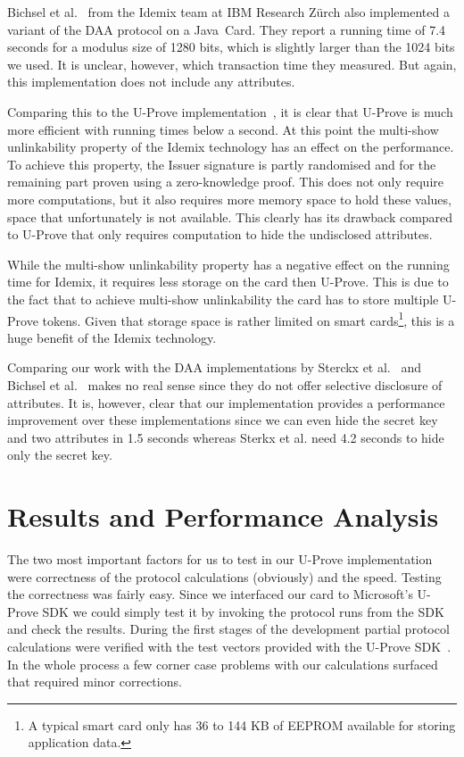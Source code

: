 Bichsel et al.~\cite{BichselCGS2009} from the Idemix team at IBM Research
Z\"urch also implemented a variant of the DAA protocol on a Java~Card. They
report a running time of 7.4 seconds for a modulus size of 1280 bits, which is
slightly larger than the 1024 bits we used. It is unclear, however, which
transaction time they measured. But again, this implementation does not include
any attributes.


Comparing this to the U-Prove implementation~\cite{MostowskiVullers11}, it is
clear that U-Prove is much more efficient with running times below a second.
At this point the multi-show unlinkability property of the Idemix technology has
an effect on the performance. To achieve this property, the Issuer signature is
partly randomised and for the remaining part proven using a zero-knowledge
proof. This does not only require more computations, but it also requires more
memory space to hold these values, space that unfortunately is not available.
This clearly has its drawback compared to U-Prove that only requires
computation to hide the undisclosed attributes.

While the multi-show unlinkability property has a negative effect on the running
time for Idemix, it requires less storage on the card then U-Prove. This is due
to the fact that to achieve multi-show unlinkability the card has to store
multiple U-Prove tokens. Given that storage space is rather
limited on smart cards\footnote{A typical smart card only has 36 to 144 KB of
EEPROM available for storing application data.}, this is a huge benefit of the
Idemix technology.

Comparing our work with the DAA implementations by Sterckx et
al.~\cite{Sterckx09} and Bichsel et al.~\cite{BichselCGS2009} makes no real
sense since they do not offer selective disclosure of attributes. It is,
however, clear that our implementation provides a performance improvement over
these implementations since we can even hide the secret key and two attributes
in 1.5 seconds whereas Sterkx et al. need 4.2 seconds to hide only the secret
key.
\section{Results and Performance Analysis}\label{sec:results}



The two most important factors for us to test in our U-Prove
implementation were correctness of the protocol calculations
(obviously) and the speed. Testing the correctness was fairly
easy. Since we interfaced our card to Microsoft's U-Prove SDK we
could simply test it by invoking the protocol runs from the SDK and
check the results. During the first stages of the development partial
protocol calculations were verified with the test vectors provided with the
U-Prove SDK~\cite{U-Prove_Vectors2011}. In the whole process a few
corner case problems with our calculations surfaced that required
minor corrections.

